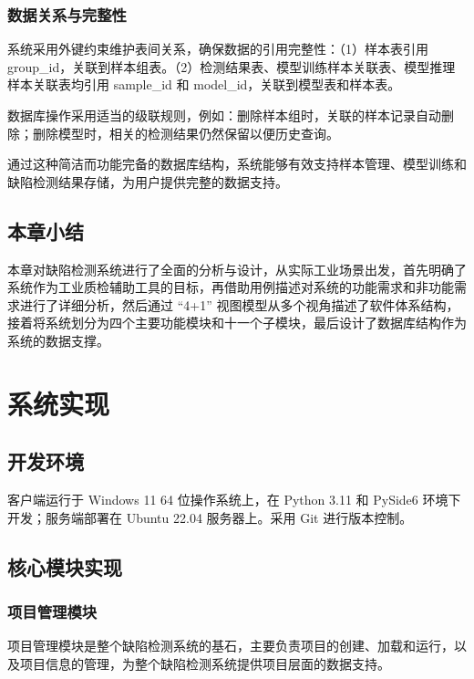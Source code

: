 \documentclass[
  ]{njuthesis}
\begin{document}
\subsection{数据关系与完整性}

系统采用外键约束维护表间关系，确保数据的引用完整性：（1）样本表引用 group\_id，关联到样本组表。（2）检测结果表、模型训练样本关联表、模型推理样本关联表均引用 sample\_id 和 model\_id，关联到模型表和样本表。

数据库操作采用适当的级联规则，例如：删除样本组时，关联的样本记录自动删除；删除模型时，相关的检测结果仍然保留以便历史查询。

通过这种简洁而功能完备的数据库结构，系统能够有效支持样本管理、模型训练和缺陷检测结果存储，为用户提供完整的数据支持。

\section{本章小结}

本章对缺陷检测系统进行了全面的分析与设计，从实际工业场景出发，首先明确了系统作为工业质检辅助工具的目标，再借助用例描述对系统的功能需求和非功能需求进行了详细分析，然后通过 “4+1” 视图模型从多个视角描述了软件体系结构，接着将系统划分为四个主要功能模块和十一个子模块，最后设计了数据库结构作为系统的数据支撑。

\chapter{系统实现}

\section{开发环境}

客户端运行于 Windows 11 64 位操作系统上，在 Python 3.11 和 PySide6 环境下开发；服务端部署在 Ubuntu 22.04 服务器上。采用 Git 进行版本控制。

\section{核心模块实现}

\subsection{项目管理模块}

项目管理模块是整个缺陷检测系统的基石，主要负责项目的创建、加载和运行，以及项目信息的管理，为整个缺陷检测系统提供项目层面的数据支持。
\end{document}
